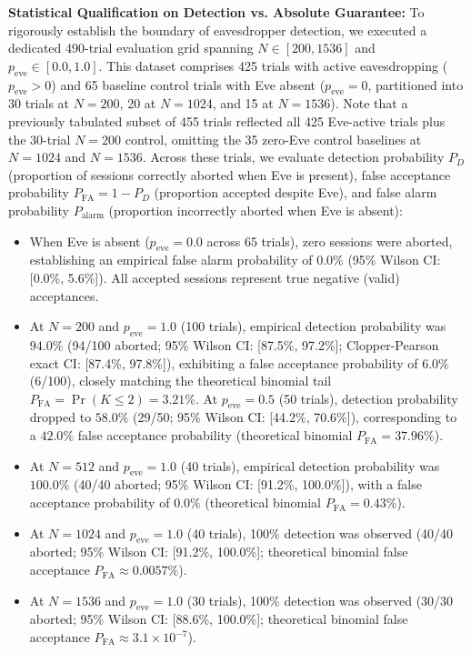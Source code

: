 \documentclass[journal,10pt,twocolumn]{article}
\begin{document}
\textbf{Statistical Qualification on Detection vs. Absolute Guarantee:} To rigorously establish the boundary of eavesdropper detection, we executed a dedicated 490-trial evaluation grid spanning $N \in [200, 1536]$ and $p_{\text{eve}} \in [0.0, 1.0]$. This dataset comprises 425 trials with active eavesdropping ($p_{\text{eve}} > 0$) and 65 baseline control trials with Eve absent ($p_{\text{eve}} = 0$, partitioned into 30 trials at $N=200$, 20 at $N=1024$, and 15 at $N=1536$). Note that a previously tabulated subset of 455 trials reflected all 425 Eve-active trials plus the 30-trial $N=200$ control, omitting the 35 zero-Eve control baselines at $N=1024$ and $N=1536$. Across these trials, we evaluate detection probability $P_D$ (proportion of sessions correctly aborted when Eve is present), false acceptance probability $P_{\text{FA}} = 1 - P_D$ (proportion accepted despite Eve), and false alarm probability $P_{\text{alarm}}$ (proportion incorrectly aborted when Eve is absent):
\begin{itemize}
    \item When Eve is absent ($p_{\text{eve}} = 0.0$ across 65 trials), zero sessions were aborted, establishing an empirical false alarm probability of $0.0\%$ (95\% Wilson CI: [0.0\%, 5.6\%]). All accepted sessions represent true negative (valid) acceptances.
    \item At $N=200$ and $p_{\text{eve}}=1.0$ (100 trials), empirical detection probability was $94.0\%$ (94/100 aborted; 95\% Wilson CI: [87.5\%, 97.2\%]; Clopper-Pearson exact CI: [87.4\%, 97.8\%]), exhibiting a false acceptance probability of $6.0\%$ (6/100), closely matching the theoretical binomial tail $P_{\text{FA}} = \Pr(K \le 2) = 3.21\%$. At $p_{\text{eve}}=0.5$ (50 trials), detection probability dropped to $58.0\%$ (29/50; 95\% Wilson CI: [44.2\%, 70.6\%]), corresponding to a $42.0\%$ false acceptance probability (theoretical binomial $P_{\text{FA}} = 37.96\%$).
    \item At $N=512$ and $p_{\text{eve}}=1.0$ (40 trials), empirical detection probability was $100.0\%$ (40/40 aborted; 95\% Wilson CI: [91.2\%, 100.0\%]), with a false acceptance probability of $0.0\%$ (theoretical binomial $P_{\text{FA}} = 0.43\%$).
    \item At $N=1024$ and $p_{\text{eve}}=1.0$ (40 trials), 100\% detection was observed (40/40 aborted; 95\% Wilson CI: [91.2\%, 100.0\%]; theoretical binomial false acceptance $P_{\text{FA}} \approx 0.0057\%$).
    \item At $N=1536$ and $p_{\text{eve}}=1.0$ (30 trials), 100\% detection was observed (30/30 aborted; 95\% Wilson CI: [88.6\%, 100.0\%]; theoretical binomial false acceptance $P_{\text{FA}} \approx 3.1 \times 10^{-7}$).
\end{itemize}
\end{document}

